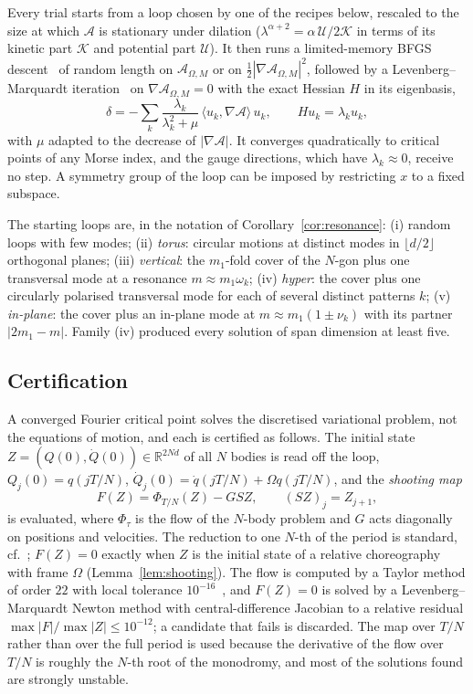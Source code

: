 \documentclass[11pt]{amsart}
\theoremstyle{definition}
\newcommand{\R}{\mathbb{R}}
\newcommand{\act}{\mathcal{A}}
\begin{document}
Every trial starts from a loop chosen by one of the recipes below, rescaled to the size at which $\act$ is stationary under dilation ($\lambda^{\alpha+2}=\alpha\,\mathcal U/2\mathcal K$ in terms of its kinetic part $\mathcal K$ and potential part $\mathcal U$). It then runs a limited-memory BFGS descent~\cite{LiuNocedal1989} of random length on $\act_{\Omega,M}$ or on $\frac12|\nabla\act_{\Omega,M}|^2$, followed by a Levenberg--Marquardt iteration~\cite{Marquardt1963} on $\nabla\act_{\Omega,M}=0$ with the exact Hessian $H$ in its eigenbasis,
\[
\delta=-\sum_k\frac{\lambda_k}{\lambda_k^2+\mu}\,\langle u_k,\nabla\act\rangle\,u_k,\qquad Hu_k=\lambda_ku_k ,
\]
with $\mu$ adapted to the decrease of $|\nabla\act|$. It converges quadratically to critical points of any Morse index, and the gauge directions, which have $\lambda_k\approx0$, receive no step. A symmetry group of the loop can be imposed by restricting $x$ to a fixed subspace.

The starting loops are, in the notation of Corollary~\ref{cor:resonance}: (i) random loops with few modes; (ii) \emph{torus}: circular motions at distinct modes in $\lfloor d/2\rfloor$ orthogonal planes; (iii) \emph{vertical}: the $m_1$-fold cover of the $N$-gon plus one transversal mode at a resonance $m\approx m_1\omega_k$; (iv) \emph{hyper}: the cover plus one circularly polarised transversal mode for each of several distinct patterns $k$; (v) \emph{in-plane}: the cover plus an in-plane mode at $m\approx m_1(1\pm\nu_k)$ with its partner $|2m_1-m|$. Family (iv) produced every solution of span dimension at least five.

\subsection{Certification}\label{sec:cert}
A converged Fourier critical point solves the discretised variational problem, not the equations of motion, and each is certified as follows. The initial state $Z=(Q(0),\dot Q(0))\in\R^{2Nd}$ of all $N$ bodies is read off the loop, $Q_j(0)=q(jT/N)$, $\dot Q_j(0)=\dot q(jT/N)+\Omega q(jT/N)$, and the \emph{shooting map}
\begin{equation}\label{eq:shooting}
F(Z)=\Phi_{T/N}(Z)-GSZ,\qquad (SZ)_j=Z_{j+1},
\end{equation}
is evaluated, where $\Phi_\tau$ is the flow of the $N$-body problem and $G$ acts diagonally on positions and velocities. The reduction to one $N$-th of the period is standard, cf.~\cite{KapelaZgliczynski2003}; $F(Z)=0$ exactly when $Z$ is the initial state of a relative choreography with frame $\Omega$ (Lemma~\ref{lem:shooting}). The flow is computed by a Taylor method of order $22$ with local tolerance $10^{-16}$~\cite{JorbaZou2005}, and $F(Z)=0$ is solved by a Levenberg--Marquardt Newton method with central-difference Jacobian to a relative residual $\max|F|/\max|Z|\le10^{-12}$; a candidate that fails is discarded. The map over $T/N$ rather than over the full period is used because the derivative of the flow over $T/N$ is roughly the $N$-th root of the monodromy, and most of the solutions found are strongly unstable.
\end{document}
